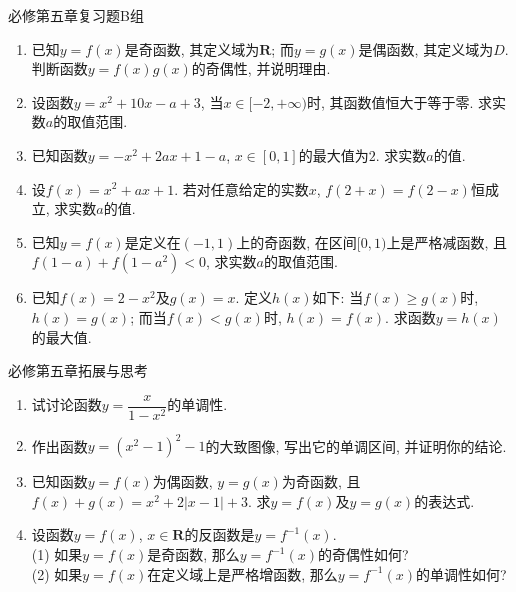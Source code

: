 \documentclass[10pt,a4paper]{article}
\begin{document}
必修第五章复习题B组
\begin{enumerate}[1.]

\item 已知$y=f(x)$是奇函数, 其定义域为$\mathbf{R}$; 而$y=g(x)$是偶函数, 其定义域为$D$. 判断函数$y=f(x)g(x)$的奇偶性, 并说明理由.
\vspace*{3cm}
\item 设函数$y=x^2+10x-a+3$, 当$x\in [-2, +\infty)$时, 其函数值恒大于等于零. 求实数$a$的取值范围.
\vspace*{3cm}
\item 已知函数$y=-x^2+2ax+1-a$, $x\in [0, 1]$的最大值为$2$. 求实数$a$的值.
\vspace*{3cm}
\item 设$f(x)=x^2+ax+1$. 若对任意给定的实数$x$, $f(2+x)=f(2-x)$恒成立, 求实数$a$的值.
\vspace*{3cm}
\item 已知$y=f(x)$是定义在$(-1, 1)$上的奇函数, 在区间$[0, 1)$上是严格减函数, 且$f(1-a)+f(1-a^2)<0$, 求实数$a$的取值范围.
\vspace*{3cm}
\item 已知$f(x)=2-x^2$及$g(x)=x$. 定义$h(x)$如下: 当$f(x)\ge g(x)$时, $h(x)=g(x)$; 而当$f(x)<g(x)$时, $h(x)=f(x)$. 求函数$y=h(x)$的最大值.
\vspace*{3cm}
\end{enumerate}

必修第五章拓展与思考
\begin{enumerate}[1.]

\item 试讨论函数$y=\dfrac{x}{1-x^2}$的单调性.
\vspace*{3cm}
\item 作出函数$y=(x^2-1)^2-1$的大致图像, 写出它的单调区间, 并证明你的结论.
\vspace*{3cm}
\item 已知函数$y=f(x)$为偶函数, $y=g(x)$为奇函数, 且$f(x)+g(x)=x^2+2|x-1|+3$. 求$y=f(x)$及$y=g(x)$的表达式.
\vspace*{3cm}
\item 设函数$y=f(x)$, $x\in \mathbf{R}$的反函数是$y=f^{-1}(x)$.\\
(1) 如果$y=f(x)$是奇函数, 那么$y=f^{-1}(x)$的奇偶性如何?\\
(2) 如果$y=f(x)$在定义域上是严格增函数, 那么$y=f^{-1}(x)$的单调性如何?
\vspace*{3cm}
\end{enumerate}
\end{document}
